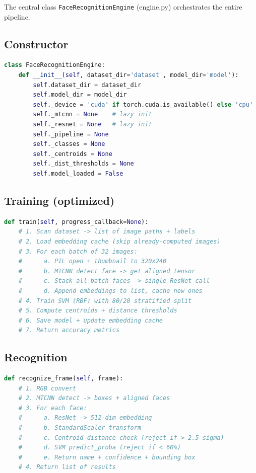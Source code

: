 \documentclass[12pt,a4paper]{article}
\begin{document}
The central class \texttt{FaceRecognitionEngine} (engine.py) orchestrates the entire pipeline.

\subsection*{Constructor}
\begin{lstlisting}[language=Python]
class FaceRecognitionEngine:
    def __init__(self, dataset_dir='dataset', model_dir='model'):
        self.dataset_dir = dataset_dir
        self.model_dir = model_dir
        self._device = 'cuda' if torch.cuda.is_available() else 'cpu'
        self._mtcnn = None    # lazy init
        self._resnet = None   # lazy init
        self._pipeline = None
        self._classes = None
        self._centroids = None
        self._dist_thresholds = None
        self.model_loaded = False
\end{lstlisting}

\subsection*{Training (optimized)}
\begin{lstlisting}[language=Python]
def train(self, progress_callback=None):
    # 1. Scan dataset -> list of image paths + labels
    # 2. Load embedding cache (skip already-computed images)
    # 3. For each batch of 32 images:
    #      a. PIL open + thumbnail to 320x240
    #      b. MTCNN detect face -> get aligned tensor
    #      c. Stack all batch faces -> single ResNet call
    #      d. Append embeddings to list, cache new ones
    # 4. Train SVM (RBF) with 80/20 stratified split
    # 5. Compute centroids + distance thresholds
    # 6. Save model + update embedding cache
    # 7. Return accuracy metrics
\end{lstlisting}

\subsection*{Recognition}
\begin{lstlisting}[language=Python]
def recognize_frame(self, frame):
    # 1. RGB convert
    # 2. MTCNN detect -> boxes + aligned faces
    # 3. For each face:
    #      a. ResNet -> 512-dim embedding
    #      b. StandardScaler transform
    #      c. Centroid-distance check (reject if > 2.5 sigma)
    #      d. SVM predict_proba (reject if < 60%)
    #      e. Return name + confidence + bounding box
    # 4. Return list of results
\end{lstlisting}
\end{document}
